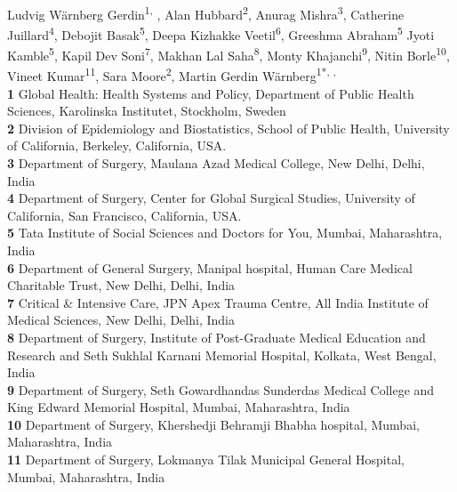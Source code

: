 \documentclass[10pt,letterpaper]{article}\usepackage[]{graphicx}\usepackage[]{color}
\date{}
\begin{document}
\vspace*{0.2in}

\begin{flushleft}
{\Large
\textbf{} %
}
\newline
\\
Ludvig Wärnberg Gerdin\textsuperscript{1, \Yinyang},
Alan Hubbard\textsuperscript{2}, 
Anurag Mishra\textsuperscript{3}, 
Catherine Juillard\textsuperscript{4}, 
Debojit Basak\textsuperscript{5}, 
Deepa Kizhakke Veetil\textsuperscript{6}, 
Greeshma Abraham\textsuperscript{5}
Jyoti Kamble\textsuperscript{5},
Kapil Dev Soni\textsuperscript{7}, 
Makhan Lal Saha\textsuperscript{8}, 
Monty Khajanchi\textsuperscript{9}, 
Nitin Borle\textsuperscript{10},
Vineet Kumar\textsuperscript{11}, 
Sara Moore\textsuperscript{2}, 
Martin Gerdin Wärnberg\textsuperscript{1*\textcurrency, \Yinyang, \ddag}
\\
\bigskip \textbf{1} Global Health: Health Systems and Policy, Department of
Public Health Sciences, Karolinska Institutet, Stockholm, Sweden
\\
\textbf{2} Division of Epidemiology and Biostatistics, School of Public Health, University of California, Berkeley, California, USA.
\\
\textbf{3} Department of Surgery, Maulana Azad Medical College, New Delhi, Delhi, India
\\
\textbf{4} Department of Surgery, Center for Global Surgical Studies, University of California, San Francisco, California, USA.
\\
\textbf{5} Tata Institute of Social Sciences and Doctors for You, Mumbai, Maharashtra, India
\\
\textbf{6} Department of General Surgery, Manipal hospital, Human Care Medical Charitable Trust, New Delhi, Delhi, India
\\
\textbf{7} Critical \& Intensive Care, JPN Apex Trauma Centre, All India Institute of Medical Sciences, New Delhi, Delhi, India
\\
\textbf{8} Department of Surgery, Institute of Post-Graduate Medical Education and Research and Seth Sukhlal Karnani Memorial Hospital, Kolkata, West Bengal, India
\\
\textbf{9} Department of Surgery, Seth Gowardhandas Sunderdas Medical College and King Edward Memorial Hospital, Mumbai, Maharashtra, India
\\
\textbf{10} Department of Surgery, Khershedji Behramji Bhabha hospital, Mumbai, Maharashtra, India
\\
\textbf{11} Department of Surgery, Lokmanya Tilak Municipal General Hospital, Mumbai, Maharashtra, India
\bigskip


\end{flushleft}
\end{document}
